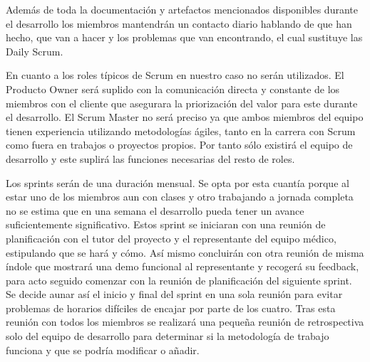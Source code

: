     Además de toda la documentación y artefactos mencionados disponibles durante el desarrollo los miembros mantendrán un contacto diario hablando de que han hecho, que van a hacer y los problemas que van encontrando, el cual sustituye las Daily Scrum.\newline

	En cuanto a los roles típicos de Scrum en nuestro caso no serán utilizados. El Producto Owner será suplido con la comunicación directa y constante  de los miembros con el cliente que asegurara la priorización del valor para este durante el desarrollo. El Scrum Master no será preciso ya que ambos miembros del equipo tienen experiencia utilizando metodologías ágiles, tanto en la carrera con Scrum como fuera en trabajos o proyectos propios. Por tanto sólo existirá el equipo de desarrollo y este suplirá las funciones necesarias del resto de roles.\newline

	Los sprints serán de una duración mensual. Se opta por esta cuantía porque al estar uno de los miembros aun con clases y otro trabajando a jornada completa no se estima que en una semana el desarrollo pueda tener un avance suficientemente significativo. Estos sprint se iniciaran con una reunión de planificación con el tutor del proyecto y el representante del equipo médico, estipulando que se hará y cómo. Así mismo concluirán con otra reunión de misma índole que mostrará una demo funcional al representante y recogerá su feedback, para acto seguido comenzar con la reunión de planificación del siguiente sprint. Se decide aunar así el inicio y final del sprint en una sola reunión para evitar problemas de horarios difíciles de encajar por parte de los cuatro. Tras esta reunión con todos los miembros se realizará una pequeña reunión de retrospectiva solo del equipo de desarrollo para determinar si la metodología de trabajo funciona y que se podría modificar o añadir.\newline


